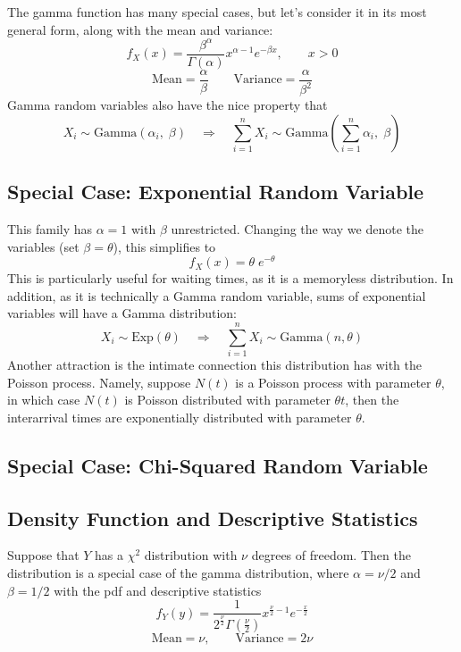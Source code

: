 \documentclass[12pt]{article}
\theoremstyle{plain}
\theoremstyle{definition}
\theoremstyle{remark}
\begin{document}
The gamma function has many special cases, but let's consider it
in its most general form, along with the mean and variance:
\begin{equation}
   f_X(x) = \frac{\beta^\alpha}{\Gamma(\alpha)} x^{\alpha-1}
      e^{-\beta x}, \qquad x > 0
\end{equation}
\[ \text{Mean} = \frac{\alpha}{\beta} \qquad \text{Variance} =
   \frac{\alpha}{\beta^2} \]
Gamma random variables also have the nice property that
\[ X_i \sim \text{Gamma}(\alpha_i, \;\beta) \quad \Rightarrow \quad
   \sum^n_{i=1} X_i \sim \text{Gamma}\left(\sum^n_{i=1} \alpha_i,\;\beta
   \right) \]

\subsection{Special Case: Exponential Random Variable}

This family has $\alpha=1$ with $\beta$ unrestricted. Changing the way
we denote the variables (set $\beta =\theta$), this simplifies to
   \[ f_X(x) = \theta\; e^{-\theta} \]
This is particularly useful for waiting times, as it is a memoryless
distribution. In addition, as it is technically a Gamma random
variable, sums of exponential variables will have a Gamma distribution:
\[ X_i \sim \text{Exp}(\theta) \quad \Rightarrow \quad
   \sum^n_{i=1} X_i \sim \text{Gamma}(n, \theta) \]
Another attraction is the intimate connection this distribution has
with the Poisson process.  Namely, suppose $N(t)$ is a Poisson process
with parameter $\theta$, in which case $N(t)$ is Poisson distributed
with parameter $\theta t$, then the interarrival times are
exponentially distributed with parameter $\theta$.


\subsection{Special Case: Chi-Squared Random Variable}

\subsection{Density Function and Descriptive Statistics}
Suppose that $Y$ has a $\chi^2$ distribution with $\nu$ degrees
of freedom. Then the distribution is a special case of the gamma
distribution, where $\alpha = \nu/2$ and $\beta = 1/2$ with the pdf
and descriptive statistics
\begin{equation}
   f_Y(y) = \frac{1}{2^{\frac{\nu}{2}} \Gamma\left(\frac{\nu}{2}\right)}
      x^{\frac{\nu}{2} - 1} e^{-\frac{x}{2}}
\end{equation}
   \[ \text{Mean} = \nu, \qquad \text{Variance} = 2 \nu \]
\end{document}

